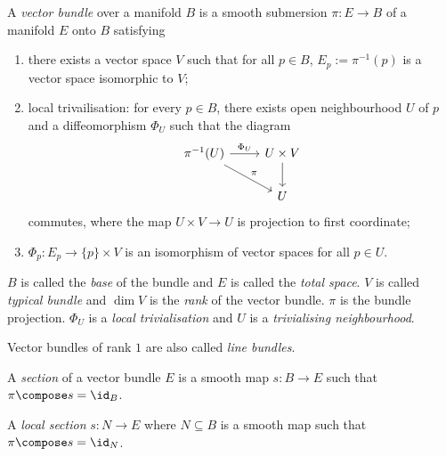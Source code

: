 \documentclass[a4paper]{article}
\begin{document}
\begin{definition}
  A \emph{vector bundle} over a manifold \(B\) is a smooth submersion \(\pi: E \to B\) of a manifold \(E\) onto \(B\) satisfying
  \begin{enumerate}
  \item there exists a vector space \(V\) such that for all \(p \in B\), \(E_p := \pi^{-1}(p)\) is a vector space isomorphic to \(V\);
  \item local trivailisation: for every \(p \in B\), there exists open neighbourhood \(U\) of \(p\) and a diffeomorphism \(\Phi_U\) such that the diagram
    \[
      \begin{tikzcd}
        \pi^{-1}(U) \ar[r, "\Phi_U"] \ar[dr, "\pi"] & U \times V \ar[d] \\
        & U
      \end{tikzcd}
    \]
    commutes, where the map \(U \times V \to U\) is projection to first coordinate;
  \item \(\Phi_p: E_p \to \{p\} \times V\) is an isomorphism of vector spaces for all \(p \in U\).
  \end{enumerate}
  \(B\) is called the \emph{base} of the bundle and \(E\) is called the \emph{total space}. \(V\) is called \emph{typical bundle} and \(\dim V\) is the \emph{rank} of the vector bundle. \(\pi\) is the bundle projection. \(\Phi_U\) is a \emph{local trivialisation} and \(U\) is a \emph{trivialising neighbourhood}.
\end{definition}

Vector bundles of rank \(1\) are also called \emph{line bundles}.

\begin{definition}[section]
  A \emph{section} of a vector bundle \(E\) is a smooth map \(s: B \to E\) such that \(\pi \compose s = \id_B\).

  A \emph{local section} \(s: N \to E\) where \(N \subseteq B\) is a smooth map such that \(\pi \compose s = \id_N\).
\end{definition}
\end{document}
